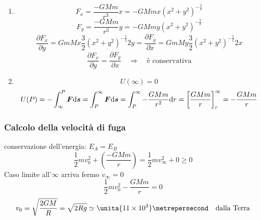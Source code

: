 \begin{Es}[Forza gravitazionale $ \ve{F}=-G\frac{Mm}{{r^3}}\ve r \quad
r=\sqrt{x^2+y^2}$]

\begin{enumerate}

\item
\begin{equation*}F_x=\frac {-GMm}{r^3}x=-GMmx(x^2+y^2)^{-\frac{3}{2}}\end{equation*}
\begin{equation*}F_y=\frac {-GMm}{r^3}y=-GMmy(x^2+y^2)^{-\frac{3}{2}}\end{equation*}
\begin{equation*}\frac{\partial F_x}{\partial y}=GmMx\frac {3}{2}(x^2+y^2)^{-\frac{5}{2}}2y=\frac{\partial F_y}{\partial x}=GmMy\frac {3}{2}(x^2+y^2)^{-\frac{5}{2}}2x \end{equation*}
\begin{equation*}\frac{\partial F_x}{\partial y}=\frac{\partial F_y}{\partial x}\quad \Rightarrow\quad \text{è conservativa}\end{equation*}

\item\begin{equation*}U(\infty)=0\end{equation*}
  \begin{equation*}U(P)=-\int_\infty ^P \boldsymbol{F} \mathrm{d} \boldsymbol{s}=\int_P^\infty \boldsymbol{F}\mathrm{d} \boldsymbol{s}=\int_P^\infty -\frac{GMm}{r^2}\mathrm{d} r=\left[\frac{GMm}{r}\right]_r^\infty=-\frac{GMm}{r}\end{equation*}
\end{enumerate}
\end{Es}
\subsubsection{Calcolo della velocità di fuga}

conservazione dell'energia: $E_A=E_B$
\begin{equation*}\frac{1}{2}mv_0^2+\left(\frac{-GMm}{r}\right)=\frac{1}{2}mv_\infty^2+0\geq0\end{equation*}
Caso limite all'$\infty$ arriva fermo $v_\infty=0$
\begin{equation*}\frac{1}{2}mv_0^2-\frac{GMm}{r}=0\end{equation*}
\begin{equation*}v_0=\sqrt{\frac{2GM}{R}}=\sqrt{2Rg}\simeq \unita{11\times 10^3}\metrepersecond\quad \text{dalla Terra}\end{equation*}


